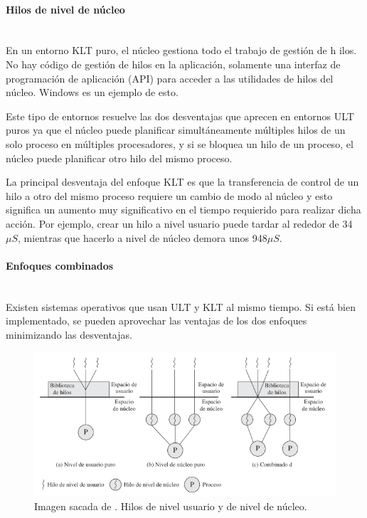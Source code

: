 \documentclass[12pt]{article}
\begin{document}
  \paragraph{Hilos de nivel de núcleo}\mbox{}\\
  En un entorno KLT puro, el núcleo gestiona todo el trabajo de gestión de h ilos. No hay código de gestión de hilos en la aplicación, solamente una interfaz de programación de aplicación (API) para acceder a las utilidades de hilos del núcleo. Windows es un ejemplo de esto.

  Este tipo de entornos resuelve las dos desventajas que aprecen en entornos ULT puros ya que el núcleo puede planificar simultáneamente múltiples hilos de un solo proceso en múltiples procesadores, y si se bloquea un hilo de un proceso, el núcleo puede planificar otro hilo del mismo proceso.

  La principal desventaja del enfoque KLT es que la transferencia de control de un hilo a otro del mismo proceso requiere un cambio de modo al núcleo y esto significa un aumento muy significativo en el tiempo requierido para realizar dicha acción. Por ejemplo, crear un hilo a nivel usuario puede tardar al rededor de 34$ \mu S $, mientras que hacerlo a nivel de núcleo demora unos 948$ \mu S $.

  \paragraph{Enfoques combinados}\mbox{}\\
  Existen sistemas operativos que usan ULT y KLT al mismo tiempo. Si está bien implementado, se pueden aprovechar las ventajas de los dos enfoques minimizando las desventajas.

  \begin{figure}[H]
    \centering
    \includegraphics[width=0.9\linewidth]{imagenes/hilos-ult-klt.png}
    \caption{Imagen sacada de \parencite{sostallings}. Hilos de nivel usuario y de nivel de núcleo.}
    \label{fig:hilos-ult-klt}
  \end{figure}
\end{document}
